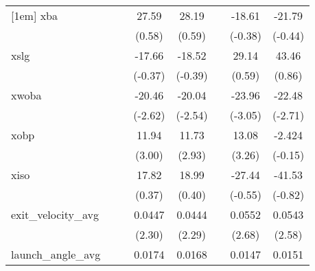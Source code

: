 {\begin{tabular}{l*{7}{c}}
[1em]
xba         &                     &                     &       27.59         &       28.19         &                     &      -18.61         &      -21.79         \\
            &                     &                     &      (0.58)         &      (0.59)         &                     &     (-0.38)         &     (-0.44)         \\
[1em]
xslg        &                     &                     &      -17.66         &      -18.52         &                     &       29.14         &       43.46         \\
            &                     &                     &     (-0.37)         &     (-0.39)         &                     &      (0.59)         &      (0.86)         \\
[1em]
xwoba       &                     &                     &      -20.46\sym{**} &      -20.04\sym{*}  &                     &      -23.96\sym{**} &      -22.48\sym{**} \\
            &                     &                     &     (-2.62)         &     (-2.54)         &                     &     (-3.05)         &     (-2.71)         \\
[1em]
xobp        &                     &                     &       11.94\sym{**} &       11.73\sym{**} &                     &       13.08\sym{**} &      -2.424         \\
            &                     &                     &      (3.00)         &      (2.93)         &                     &      (3.26)         &     (-0.15)         \\
[1em]
xiso        &                     &                     &       17.82         &       18.99         &                     &      -27.44         &      -41.53         \\
            &                     &                     &      (0.37)         &      (0.40)         &                     &     (-0.55)         &     (-0.82)         \\
[1em]
exit\_velocity\_avg&                     &                     &      0.0447\sym{*}  &      0.0444\sym{*}  &                     &      0.0552\sym{**} &      0.0543\sym{*}  \\
            &                     &                     &      (2.30)         &      (2.29)         &                     &      (2.68)         &      (2.58)         \\
[1em]
launch\_angle\_avg&                     &                     &      0.0174\sym{*}  &      0.0168\sym{*}  &                     &      0.0147         &      0.0151         \\

\end{tabular}}
